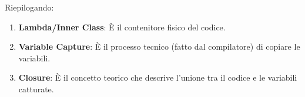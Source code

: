 Riepilogando:
\begin{enumerate}
    \item \textbf{Lambda/Inner Class}: È il contenitore fisico del codice.
    \item \textbf{Variable Capture}: È il processo tecnico (fatto dal compilatore) di copiare le variabili.
    \item \textbf{Closure}: È il concetto teorico che descrive l'unione tra il codice e le variabili catturate.
\end{enumerate}














